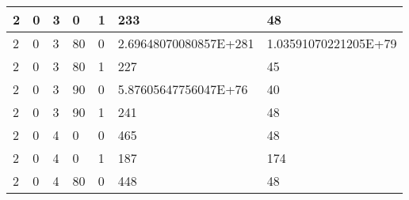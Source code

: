 \documentclass{article}
\theoremstyle{definition}
\begin{document}
\begin{table}[]
\begin{tabular}{|l|l|l|l|l|l|l|}
2                                      & 0                                       & 3                                      & 0                                    & 1                                      & 233                                      & 48                                     \\ \hline
2                                      & 0                                       & 3                                      & 80                                   & 0                                      & 2.69648070080857E+281                    & 1.03591070221205E+79                   \\ \hline
2                                      & 0                                       & 3                                      & 80                                   & 1                                      & 227                                      & 45                                     \\ \hline
2                                      & 0                                       & 3                                      & 90                                   & 0                                      & 5.87605647756047E+76                     & 40                                     \\ \hline
2                                      & 0                                       & 3                                      & 90                                   & 1                                      & 241                                      & 48                                     \\ \hline
2                                      & 0                                       & 4                                      & 0                                    & 0                                      & 465                                      & 48                                     \\ \hline
2                                      & 0                                       & 4                                      & 0                                    & 1                                      & 187                                      & 174                                    \\ \hline
2                                      & 0                                       & 4                                      & 80                                   & 0                                      & 448                                      & 48                                     \\ \hline

\end{tabular}
\end{table}
\end{document}
